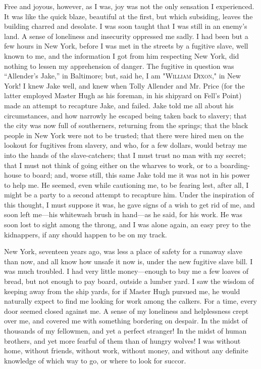 Free and joyous, however, as I was, joy was not the only sensation I
experienced. It was like the quick blaze, beautiful at the first, but
which subsiding, leaves the building charred and desolate. I was soon
taught that I was still in an enemy's land. A sense of loneliness and
insecurity oppressed me sadly. I had been but a few hours in New York,
before I was met in the streets by a fugitive slave, well known to me,
and the information I got from him respecting New York, did nothing to
lessen my apprehension of danger. The fugitive in question was
``Allender's Jake,'' in Baltimore; but, said he, I am "\textsc{William
Dixon}," in New York! I knew Jake well, and knew when Tolly Allender and
Mr. Price (for the latter employed Master Hugh as his foreman, in his
shipyard on Fell's Point) made an attempt to recapture Jake, and failed.
Jake told me all about his circumstances, and how narrowly he
{\protect\hypertarget{338}{}{}}escaped being taken back to slavery; that
the city was now full of southerners, returning from the springs; that
the black people in New York were not to be trusted; that there were
hired men on the lookout for fugitives from slavery, and who, for a few
dollars, would betray me into the hands of the slave-catchers; that I
must trust no man with my secret; that I must not think of going either
on the wharves to work, or to a boarding-house to board; and, worse
still, this same Jake told me it was not in his power to help me. He
seemed, even while cautioning me, to be fearing lest, after all, I might
be a party to a second attempt to recapture him. Under the inspiration
of this thought, I must suppose it was, he gave signs of a wish to get
rid of me, and soon left me---his whitewash brush in hand---as he said,
for his work. He was soon lost to sight among the throng, and I was
alone again, an easy prey to the kidnappers, if any should happen to be
on my track.

New York, seventeen years ago, was less a place of safety for a runaway
slave than now, and all know how unsafe it now is, under the new
fugitive slave bill. I was much troubled. I had very little
money---enough to buy me a few loaves of bread, but not enough to pay
board, outside a lumber yard. I saw the wisdom of keeping away from the
ship yards, for if Master Hugh pursued me, he would naturally expect to
find me looking for work among the calkers. For a time, every door
seemed closed against me. A sense of my loneliness and helplessness
crept over me, and covered me with something bordering on despair. In
the midst of thousands of my {\protect\hypertarget{339}{}{}}fellowmen,
and yet a perfect stranger! In the midst of human brothers, and yet more
fearful of them than of hungry wolves! I was without home, without
friends, without work, without money, and without any definite knowledge
of which way to go, or where to look for succor.


